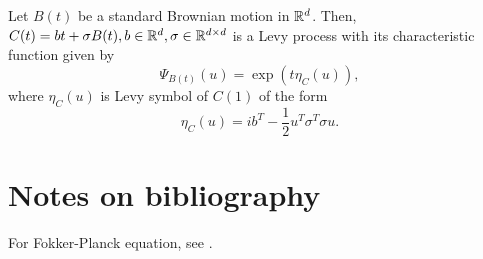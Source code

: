\begin{refsection}
\begin{example}
	Let $B(t)$ be a standard Brownian motion in $\mathbb{R}^d$. Then, $C(t) = bt + \sigma B(t), b\in \mathbb{R}^d, \sigma\in \mathbb{R}^{d\times d}$ is a Levy process with its characteristic function given by 
	$$\Psi_{B(t)}(u) = \exp(t\eta_C(u)),$$
	where $\eta_C(u)$ is Levy symbol of $C(1)$ of the form
	$$\eta_C(u) = ib^T - \frac{1}{2} u^T \sigma^T\sigma u.$$
\end{example}



	\section{Notes on bibliography}
	
	
	For Fokker-Planck equation, see \cite{risken2012fokker}\cite{gardiner2009stochastic}.
	
	\printbibliography
\end{refsection}

